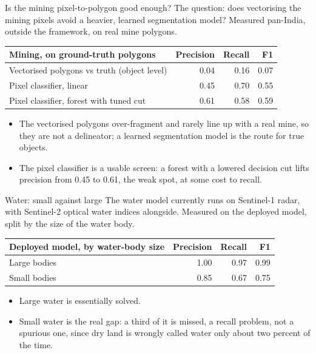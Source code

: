 \documentclass[aspectratio=169]{beamer}
\begin{document}
\begin{frame}{Is the mining pixel-to-polygon good enough?}
The question: does vectorising the mining pixels avoid a heavier, learned segmentation model? Measured
pan-India, outside the framework, on real mine polygons.
\begin{center}
\begin{tabular}{lrrr}
\toprule
Mining, on ground-truth polygons & Precision & Recall & F1 \\
\midrule
Vectorised polygons vs truth (object level) & 0.04 & 0.16 & 0.07 \\
Pixel classifier, linear & 0.45 & 0.70 & 0.55 \\
Pixel classifier, forest with tuned cut & 0.61 & 0.58 & 0.59 \\
\bottomrule
\end{tabular}
\end{center}
\begin{itemize}\small
  \item The vectorised polygons over-fragment and rarely line up with a real mine, so they are not a
  delineator; a learned segmentation model is the route for true objects.
  \item The pixel classifier is a usable screen: a forest with a lowered decision cut lifts precision
  from 0.45 to 0.61, the weak spot, at some cost to recall.
\end{itemize}
\end{frame}

\begin{frame}{Water: small against large}
The water model currently runs on Sentinel-1 radar, with Sentinel-2 optical water indices alongside.
Measured on the deployed model, split by the size of the water body.
\begin{center}
\begin{tabular}{lrrr}
\toprule
Deployed model, by water-body size & Precision & Recall & F1 \\
\midrule
Large bodies & 1.00 & 0.97 & 0.99 \\
Small bodies & 0.85 & 0.67 & 0.75 \\
\bottomrule
\end{tabular}
\end{center}
\begin{itemize}\small
  \item Large water is essentially solved.
  \item Small water is the real gap: a third of it is missed, a recall problem, not a spurious one, since
  dry land is wrongly called water only about two percent of the time.
\end{itemize}
\end{frame}
\end{document}
